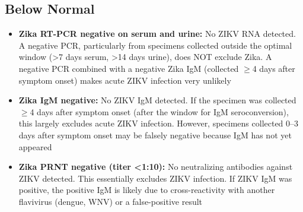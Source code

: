 \subsection*{Below Normal}
\begin{itemize}
  \item \textbf{Zika RT-PCR negative on serum and urine:} No ZIKV RNA detected. A negative PCR, particularly from specimens collected outside the optimal window (>7 days serum, >14 days urine), does NOT exclude Zika. A negative PCR combined with a negative Zika IgM (collected $\geq$4 days after symptom onset) makes acute ZIKV infection very unlikely
  \item \textbf{Zika IgM negative:} No ZIKV IgM detected. If the specimen was collected $\geq$4 days after symptom onset (after the window for IgM seroconversion), this largely excludes acute ZIKV infection. However, specimens collected 0--3 days after symptom onset may be falsely negative because IgM has not yet appeared
  \item \textbf{Zika PRNT negative (titer <1:10):} No neutralizing antibodies against ZIKV detected. This essentially excludes ZIKV infection. If ZIKV IgM was positive, the positive IgM is likely due to cross-reactivity with another flavivirus (dengue, WNV) or a false-positive result
\end{itemize}

